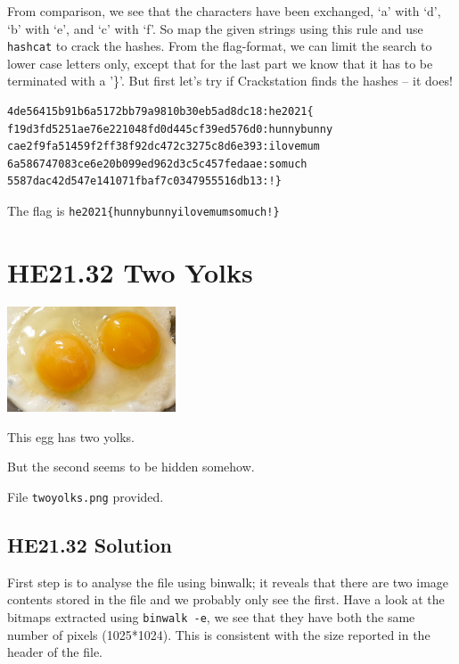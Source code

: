 \documentclass[english,a4paper,nols,noindent]{tufte-handout}
\begin{document}
From comparison, we see that the characters have been exchanged, `a' with `d',
`b' with `e', and `c' with `f'.  So map the given strings using this rule and
use \verb+hashcat+ to crack the hashes.  From the flag-format, we can limit the
search to lower case letters only, except that for the last part we know that
it has to be terminated with a '\}'.  But first let's try if Crackstation finds
the hashes -- it does!

\begin{verbatim} 
4de56415b91b6a5172bb79a9810b30eb5ad8dc18:he2021{
f19d3fd5251ae76e221048fd0d445cf39ed576d0:hunnybunny
cae2f9fa51459f2ff38f92dc472c3275c8d6e393:ilovemum
6a586747083ce6e20b099ed962d3c5c457fedaae:somuch
5587dac42d547e141071fbaf7c0347955516db13:!}
\end{verbatim} 

The flag is \verb+he2021{hunnybunnyilovemumsomuch!}+

\hypertarget{he21.32}{%
\section{HE21.32 Two Yolks}
  \label{he21.32}}
\begin{marginfigure}
    \includegraphics[width=50mm]{images/challenge32.jpg}
\end{marginfigure}

\noindent This egg has two yolks.

But the second seems to be hidden somehow.

File \verb+twoyolks.png+ provided.

\hypertarget{he21.32-solution}{%
\subsection{HE21.32 Solution}\label{he21.32-solution}}

\noindent First step is to analyse the file using binwalk; it reveals that
there are two image contents stored in the file and we probably only see the
first.  Have a look at the bitmaps extracted using \verb+binwalk -e+, we see
that they have both the same number of pixels (1025*1024).  This is consistent
with the size reported in the header of the file.
\end{document}
